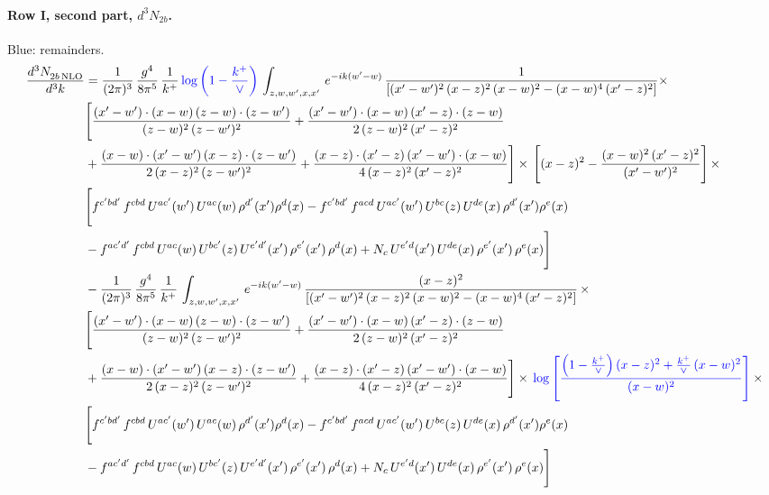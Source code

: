 \documentclass[10pt]{article}
\numberwithin{equation}{section}
\newcommand{\new}[1]{{\color{blue}#1}}
\begin{document}
\paragraph{Row I, second part, $d^3N_{2b}$.}
\new{Blue}: remainders.
\begin{align}
    \frac{d^{3}N_{2b\,\rm NLO}^{\rm}}{d^{3}k}  & =  \frac{1}{(2\pi)^{3}}\, \frac{g^{4}}{8\pi^{5}}\,\frac{1}{k^{+}}\,\new{\log{\left(1-\frac{k^{+}}{\vee}\right)}}\,\int_{z,w,w^{\prime},x,x'}\, e^{-ik(w^{\prime}-w)}\, \frac{1}{\left[(x'-w')^{2}\,(x-z)^{2}\,(x-w)^{2} - (x-w)^{4}\, (x'-z)^{2}\right]} \times\notag \\ & \Bigg[\frac{(x'-w')\cdot (x-w)\, (z-w)\cdot (z-w')}{(z-w)^{2}\, (z-w')^{2}}+\frac{(x'-w')\cdot (x-w)\, (x'-z)\cdot (z-w)}{2\, (z-w)^{2}\, (x'-z)^{2}}\notag \\ & +\frac{(x-w)\cdot (x'-w')\, (x-z)\cdot (z-w')}{2\, (x-z)^{2}\, (z-w')^{2}}+\frac{(x-z)\cdot (x'-z)\, (x'-w')\cdot (x-w)}{4\, (x-z)^{2}\, (x'-z)^{2}}\Bigg] \times\,\Bigg[(x-z)^{2} - \frac{(x-w)^{2}\, (x'-z)^{2}}{(x'-w')^{2}}\Bigg]\,\times \notag \\ & \Bigg[f^{c'bd'}\,f^{cbd}\, U^{ac'}(w')\,U^{ac}(w)\,\rho^{d'}(x')\rho^{d}(x)- f^{c'bd'}\,f^{acd}\,U^{ac'}(w')\,U^{bc}(z)\,U^{de}(x)\,\rho^{d'}(x')\rho^{e}(x) \notag \\ & -f^{ac'd'}\,f^{cbd}\,U^{ac}(w)\,U^{bc'}(z)\,U^{e'd'}(x')\,\rho^{e'}(x')\,\rho^{d}(x) +N_{c}\,U^{e'd}(x')\,U^{de}(x)\,\rho^{e'}(x')\,\rho^{e}(x)\Bigg] \notag \\
&  - \frac{1}{(2\pi)^{3}}\, \frac{g^{4}}{8\pi^{5}}\,\frac{1}{k^{+}}\,\int_{z,w,w^{\prime},x,x'}\, e^{-ik(w^{\prime}-w)}\, \frac{(x-z)^{2}}{\left[(x'-w')^{2}\,(x-z)^{2}\,(x-w)^{2} - (x-w)^{4}\, (x'-z)^{2}\right]}\,  \times\notag \\ & \Bigg[\frac{(x'-w')\cdot (x-w)\, (z-w)\cdot (z-w')}{(z-w)^{2}\, (z-w')^{2}}+\frac{(x'-w')\cdot (x-w)\, (x'-z)\cdot (z-w)}{2\, (z-w)^{2}\, (x'-z)^{2}}\notag \\ & +\frac{(x-w)\cdot (x'-w')\, (x-z)\cdot (z-w')}{2\, (x-z)^{2}\, (z-w')^{2}}+\frac{(x-z)\cdot (x'-z)\, (x'-w')\cdot (x-w)}{4\, (x-z)^{2}\, (x'-z)^{2}}\Bigg] \times\,\new{\log{\left[\frac{\left(1-\frac{k^{+}}{\vee}\right)(x-z)^{2}+\frac{k^{+}}{\vee}\,(x-w)^{2}}{(x-w)^{2}}\right]}}\,\times \notag \\ & \Bigg[f^{c'bd'}\,f^{cbd}\, U^{ac'}(w')\,U^{ac}(w)\,\rho^{d'}(x')\rho^{d}(x)- f^{c'bd'}\,f^{acd}\,U^{ac'}(w')\,U^{bc}(z)\,U^{de}(x)\,\rho^{d'}(x')\rho^{e}(x) \notag \\ & -f^{ac'd'}\,f^{cbd}\,U^{ac}(w)\,U^{bc'}(z)\,U^{e'd'}(x')\,\rho^{e'}(x')\,\rho^{d}(x) +N_{c}\,U^{e'd}(x')\,U^{de}(x)\,\rho^{e'}(x')\,\rho^{e}(x)\Bigg] \notag \\

\end{align}
\end{document}
